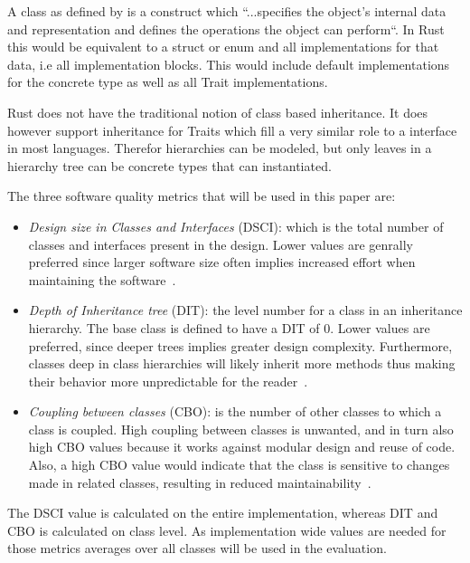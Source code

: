 \documentclass[conference]{IEEEtran}
\begin{document}
A class as defined by \citet{gamma1993:gof} is a construct which  ``...specifies the object's internal data and representation and defines the operations the object can perform``.
In Rust this would be equivalent to a struct or enum and all implementations for that data, i.e all implementation blocks.
This would include default implementations for the concrete type as well as all Trait implementations.

Rust does not have the traditional notion of class based inheritance.
It does however support inheritance for Traits which fill a very similar role to a interface in most languages.
Therefor hierarchies can be modeled, but only leaves in a hierarchy tree can be concrete types that can instantiated.

The three software quality metrics that will be used in this paper are:
\begin{itemize}
    \item
        \emph{Design size in Classes and Interfaces} (DSCI): which is the total number of classes and interfaces present in the design.
        Lower values are genrally preferred since larger software size often implies increased effort when maintaining the software~\cite{riaz2009:systematic}.
    \item
        \emph{Depth of Inheritance tree} (DIT): the level number for a class in an inheritance hierarchy.
        The base class is defined to have a DIT of 0.
        Lower values are preferred, since deeper trees implies greater design complexity.
        Furthermore, classes deep in class hierarchies will likely inherit more methods thus making their behavior more unpredictable for the reader~\cite{kemerer:metrics}.
    \item
        \emph{Coupling between classes} (CBO): is the number of other classes to which a class is coupled.
        High coupling between classes is unwanted, and in turn also high CBO values because it works against modular design and reuse of code.
        Also, a high CBO value would indicate that the class is sensitive to changes made in related classes, resulting in reduced maintainability~\cite{kemerer:metrics}.

\end{itemize}

The DSCI value is calculated on the entire implementation, whereas DIT and CBO is calculated on class level.
As implementation wide values are needed for those metrics averages over all classes will be used in the evaluation.
\end{document}
